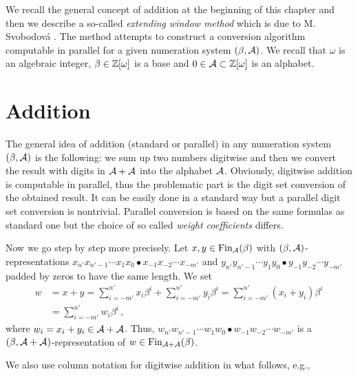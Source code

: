 
We recall the general concept of addition at the beginning of this chapter and then we describe a so-called \emph{extending window method} which is due to M. Svobodov\'a \cite{milena}. The method attempts to construct a conversion algorithm computable in parallel for a given numeration system $(\beta,\mathcal{A})$. We recall that $\omega$ is an algebraic integer, $\beta \in \mathbb{Z}[\omega]$ is a base and $0\in\mathcal{A}\subset\mathbb{Z}[\omega]$ is an alphabet. 

\section{Addition}

The general idea of addition (standard or parallel) in any numeration system $(\beta,\mathcal{A})$ is the following: we sum up two numbers digitwise and then we convert the result with digits in $\mathcal{A}+\mathcal{A}$ into the alphabet $\mathcal{A}$. Obviously, digitwise addition is computable in parallel, thus the problematic part is the digit set conversion of the obtained result. It can be easily done in a standard way but a parallel digit set conversion is nontrivial. Parallel conversion is based on the same  formulas as standard one but the choice of so called \emph{weight coefficients} differs.

Now we go step by step more precisely. Let $x,y \in \text{Fin}_{\mathcal{A}}(\beta)$ with $(\beta,\mathcal{A})$-representations $x_{n'}x_{{n'}-1}\cdots x_1 x_0\bullet x_{-1} x_{-2} \cdots x_{-m'}$ and $y_{n'}y_{{n'}-1}\cdots y_1 y_0\bullet y_{-1} y_{-2} \cdots y_{-m'}$ padded by zeros to have the same length. We set 
  \begin{align*}
    w&=x+y =\sum_{i=-m'}^{n'} x_i\beta^i + \sum_{i=-m'}^{n'} y_i\beta^i = \sum_{i=-m'}^{n'} (x_i+y_i)\beta^i \\
    &=\sum_{i=-m'}^{n'} w_i\beta^i \,,
  \end{align*}
  where $w_i=x_i+y_i \in \mathcal{A} +\mathcal{A}$. Thus, $w_{n'} w_{{n'}-1}\cdots w_1 w_0 \bullet w_{-1} w_{-2} \cdots w_{-m'}$ is a  $(\beta, \mathcal{A}+\mathcal{A})$-representation of $w\in \text{Fin}_{\mathcal{A}+\mathcal{A}}(\beta)$. 

We also use column notation for digitwise addition in what follows, e.g.,    
 
